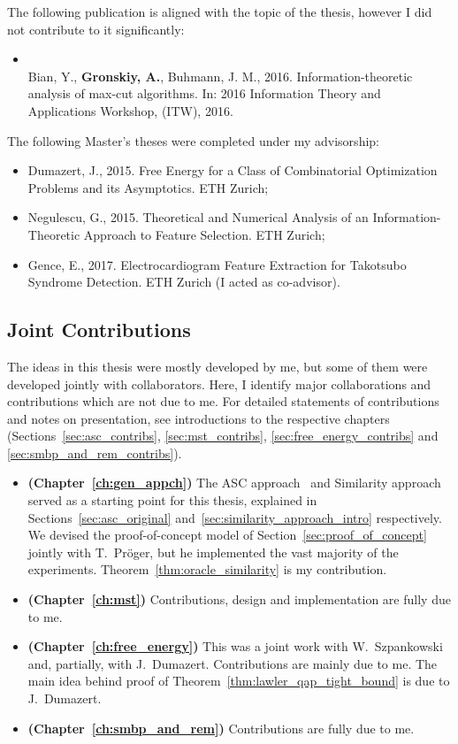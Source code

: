 The following publication is aligned with the topic of the thesis, however I 
did not contribute to it significantly:
\begin{itemize}
    \item \citep{bian16} \\
    Bian, Y., \textbf{Gronskiy, A.}, Buhmann, J. M., 2016. Information-theoretic analysis
    of max-cut algorithms. In: 2016 Information Theory and Applications
    Workshop, (ITW), 2016.
\end{itemize}

The following Master's theses were completed under my advisorship:
\begin{itemize}
    \item Dumazert, J., 2015. Free Energy for a Class of Combinatorial
    Optimization Problems and its Asymptotics. ETH Zurich;
    \item Negulescu, G., 2015. Theoretical and Numerical Analysis of an
    Information-Theoretic Approach to Feature Selection. ETH Zurich;
    \item Gence, E., 2017. Electrocardiogram Feature Extraction for Takotsubo
    Syndrome Detection. ETH Zurich (I acted as co-advisor).
\end{itemize}

\subsection*{Joint Contributions}

The ideas in this thesis were mostly developed by me, but some of them were
developed jointly with collaborators. Here, I identify major collaborations and
contributions which are not due to me. For detailed statements of contributions
and notes on presentation, see introductions to the respective chapters
(Sections~\ref{sec:asc_contribs}, \ref{sec:mst_contribs},
\ref{sec:free_energy_contribs} and \ref{sec:smbp_and_rem_contribs}).

\begin{itemize}
    \item {\sffamily\bfseries (Chapter~\ref{ch:gen_appch})}
    The ASC approach~\citep{conf/isit/Buhmann10} and Similarity
    approach~\citep{Sramek:PhD} served as a starting point for this
    thesis, explained in Sections~\ref{sec:asc_original}
    and~\ref{sec:similarity_approach_intro} respectively. We devised the
    proof-of-concept model of Section~\ref{sec:proof_of_concept} jointly with
    T.~Pr\"oger, but he implemented the vast majority of the experiments.
    Theorem~\ref{thm:oracle_similarity} is my contribution.
    \item {\sffamily\bfseries (Chapter~\ref{ch:mst})}
    Contributions, design and implementation are fully due to me.
    \item {\sffamily\bfseries (Chapter~\ref{ch:free_energy})} 
    This was a joint work with W.~Szpankowski and, partially, with J.~Dumazert.
    Contributions are mainly due to me. The main idea behind proof of
    Theorem~\ref{thm:lawler_qap_tight_bound} is due to J.~Dumazert.
    \item {\sffamily\bfseries (Chapter~\ref{ch:smbp_and_rem})}
    Contributions are fully due to me.
\end{itemize}


